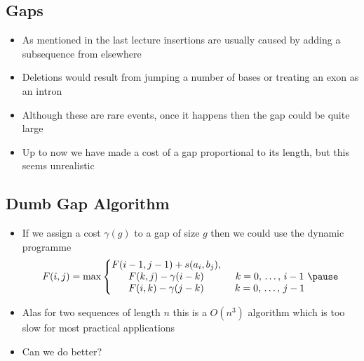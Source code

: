 \Outline %

\begin{slide}
\section{Gaps}

\begin{PauseHighLight}
  \begin{itemize}
  \item As mentioned in the last lecture insertions are usually caused
    by adding a subsequence from elsewhere\pause
  \item Deletions would result from jumping a number of bases or
    treating an exon as an intron\pause
  \item Although these are rare events, once it happens then the gap
    could be quite large\pause
  \item Up to now we have made a cost of a gap proportional to its
    length, but this seems unrealistic\pause
  \end{itemize}
\end{PauseHighLight}

\end{slide}


\begin{slide}
\section{Dumb Gap Algorithm}

\begin{PauseHighLight}
  \begin{itemize}
  \item If we assign a cost $\gamma(g)$ to a gap of size $g$ then we
    could use the dynamic programme
    \begin{align*}
      F(i,j) = \max \left\{
      \begin{matrix}
        F(i-1,j-1) + s(a_i, b_j), &\\
        F(k,j) -\gamma(i-k) & \hspace{1ex} k=0,\,\ldots,\, i-1\\
        F(i,k) -\gamma(j-k) & \hspace{1ex} k=0,\,\ldots,\, j-1\\
      \end{matrix}\right.\pause
    \end{align*}
  \item Alas for two sequences of length $n$ this is a $O(n^3)$
    algorithm which is too slow for most practical applications\pause
  \item Can we do better?\pause
  \end{itemize}
\end{PauseHighLight}

\end{slide}

